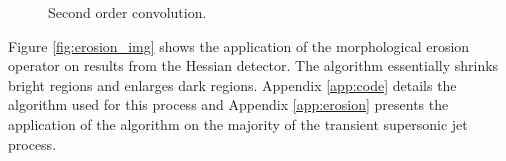 \begin{figure}[H]
  \centering
  \hfill
  \caption{Second order convolution.}
  \label{fig:erosion}
\end{figure}

Figure \ref{fig:erosion_img} shows the application of the morphological erosion operator on results from the Hessian detector. The algorithm essentially shrinks bright regions and enlarges dark regions. Appendix \ref{app:code} details the algorithm used for this process and Appendix \ref{app:erosion} presents the application of the algorithm on the majority of the transient supersonic jet process.

